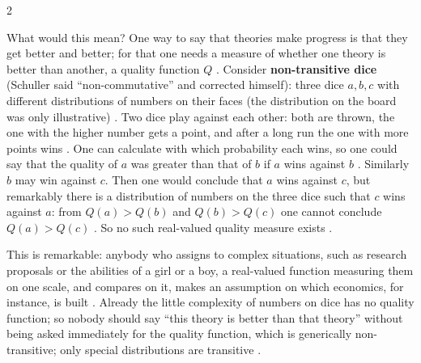 \begin{paracol}{2}
\begin{secondary}
What would this mean? One way to say that theories make progress is that they get better and better; for that one needs a measure
of whether one theory is better than another, a quality function $Q$ . Consider \textbf{non-transitive dice}
(Schuller said ``non-commutative'' and corrected himself): three dice $a,b,c$ with different distributions of numbers on their
faces (the distribution on the board was only illustrative) . Two dice play
against each other: both are thrown, the one with the higher number gets a point, and after a long run the one with more points
wins . One can calculate with which probability each wins, so one could say that
the quality of $a$ was greater than that of $b$ if $a$ wins against $b$ . Similarly $b$ may win
against $c$. Then one would conclude that $a$ wins against $c$, but remarkably there is a distribution of numbers on the three dice such
that $c$ wins against $a$: from $Q(a)>Q(b)$ and $Q(b)>Q(c)$ one cannot conclude $Q(a)>Q(c)$ .
So no such real-valued quality measure exists .

This is remarkable: anybody who assigns to complex situations, such as research proposals or the abilities of a girl or a boy, a
real-valued function measuring them on one scale, and compares on it, makes an assumption on which economics, for instance, is built
. Already the little complexity of numbers on dice has no quality function; so nobody should say
``this theory is better than that theory'' without being asked immediately for the quality function, which is generically
non-transitive; only special distributions are transitive .


\end{secondary}
\end{paracol}
